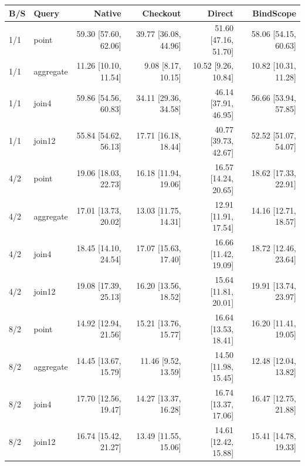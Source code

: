 \begin{tabular}{@{}llrrrr@{}}\toprule
B/S & Query & Native & Checkout & Direct & BindScope\\\midrule
1/1 & point & 59.30 [57.60, 62.06] & 39.77 [36.08, 44.96] & 51.60 [47.16, 51.70] & 58.06 [54.15, 60.63] \\
1/1 & aggregate & 11.26 [10.10, 11.54] & 9.08 [8.17, 10.15] & 10.52 [9.26, 10.84] & 10.82 [10.31, 11.28] \\
1/1 & join4 & 59.86 [54.56, 60.83] & 34.11 [29.36, 34.58] & 46.14 [37.91, 46.95] & 56.66 [53.94, 57.85] \\
1/1 & join12 & 55.84 [54.62, 56.13] & 17.71 [16.18, 18.44] & 40.77 [39.73, 42.67] & 52.52 [51.07, 54.07] \\

\midrule
4/2 & point & 19.06 [18.03, 22.73] & 16.18 [11.94, 19.06] & 16.57 [14.24, 20.65] & 18.62 [17.33, 22.91] \\
4/2 & aggregate & 17.01 [13.73, 20.02] & 13.03 [11.75, 14.31] & 12.91 [11.91, 17.54] & 14.16 [12.71, 18.57] \\
4/2 & join4 & 18.45 [14.10, 24.54] & 17.07 [15.63, 17.40] & 16.66 [11.42, 19.09] & 18.72 [12.46, 23.64] \\
4/2 & join12 & 19.08 [17.39, 25.13] & 16.20 [13.56, 18.52] & 15.64 [11.81, 20.01] & 19.91 [13.74, 23.97] \\

\midrule
8/2 & point & 14.92 [12.94, 21.56] & 15.21 [13.76, 15.77] & 16.64 [13.53, 18.41] & 16.20 [11.41, 19.05] \\
8/2 & aggregate & 14.45 [13.67, 15.79] & 11.46 [9.52, 13.59] & 14.50 [11.98, 15.45] & 12.48 [12.04, 13.82] \\
8/2 & join4 & 17.70 [12.56, 19.47] & 14.27 [13.37, 16.28] & 16.74 [13.37, 17.06] & 16.47 [12.75, 21.88] \\
8/2 & join12 & 16.74 [15.42, 21.27] & 13.49 [11.55, 15.06] & 14.61 [12.42, 15.88] & 15.41 [14.78, 19.33] \\
\bottomrule\end{tabular}
